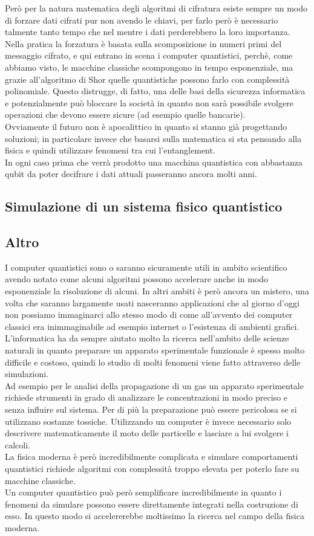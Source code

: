 Però per la natura matematica degli algoritmi di cifratura esiste sempre un modo di forzare dati cifrati pur non avendo le chiavi, per farlo però è necessario talmente tanto tempo che nel mentre i dati perderebbero la loro importanza.\\
Nella pratica la forzatura è basata sulla scomposizione in numeri primi del messaggio cifrato, e qui entrano in scena i computer quantistici, perchè, come abbiamo visto, le macchine classiche scompongono in tempo esponenziale, ma grazie all'algoritmo di Shor quelle quantistiche possono farlo con complessità polinomiale. Questo distrugge, di fatto, una delle basi della sicurezza informatica e potenzialmente può bloccare la società in quanto non sarà possibile svolgere operazioni che devono essere sicure (ad esempio quelle bancarie).\\
Ovviamente il futuro non è apocalittico in quanto si stanno già progettando soluzioni; in particolare invece che basarsi sulla matematica si sta pensando alla fisica e quindi utilizzare fenomeni tra cui l'entanglement.\\
In ogni caso prima che verrà prodotto una macchina quantistica con abbastanza qubit da poter decifrare i dati attuali passeranno ancora molti anni.
\subsection{Simulazione di un sistema fisico quantistico}
\subsection{Altro}
I computer quantistici sono o saranno sicuramente utili in ambito scientifico avendo notato come alcuni algoritmi possono accelerare anche in modo esponenziale la risoluzione di alcuni. In altri ambiti è però ancora un mistero, una volta che saranno largamente usati nasceranno applicazioni che al giorno d'oggi non possiamo immaginarci allo stesso modo di come all'avvento dei computer classici era inimmaginabile ad esempio internet o l'esistenza di ambienti grafici.
L'informatica ha da sempre aiutato molto la ricerca nell'ambito delle scienze naturali in quanto preparare un apparato sperimentale funzionale è spesso molto difficile e costoso, quindi lo studio di molti fenomeni viene fatto attraverso delle simulazioni.\\
Ad esempio per le analisi della propagazione di un gas un apparato sperimentale richiede strumenti in grado di analizzare le concentrazioni in modo preciso e senza influire sul sistema. Per di più la preparazione può essere pericolosa se si utilizzano sostanze tossiche. Utilizzando un computer è invece necessario solo descrivere matematicamente il moto delle particelle e lasciare a lui svolgere i calcoli.\\
La fisica moderna è però incredibilmente complicata e simulare comportamenti quantistici richiede algoritmi con complessità troppo elevata per poterlo fare su macchine classiche.\\
Un computer quantistico può però semplificare incredibilmente in quanto i fenomeni da simulare possono essere direttamente integrati nella costruzione di esso. In questo modo si accelererebbe moltissimo la ricerca nel campo della fisica moderna.
